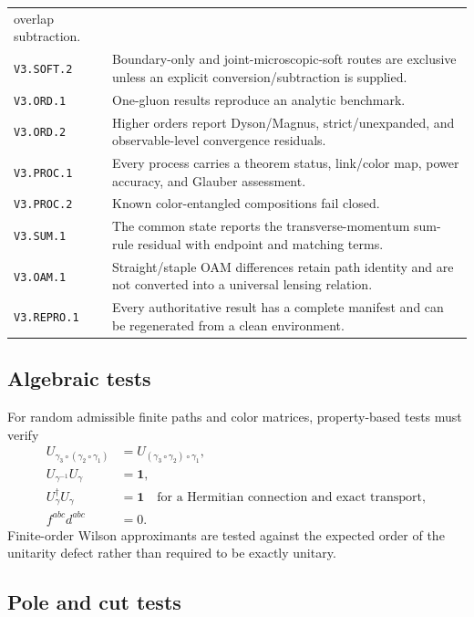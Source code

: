 \documentclass[11pt]{article}
\newcommand{\bbone}{\bm 1}
\begin{document}
\begin{longtable}{L{0.14\textwidth}L{0.77\textwidth}}
overlap subtraction.\\
\texttt{V3.SOFT.2} & Boundary-only and joint-microscopic-soft routes are
exclusive unless an explicit conversion/subtraction is supplied.\\
\texttt{V3.ORD.1} & One-gluon results reproduce an analytic benchmark.\\
\texttt{V3.ORD.2} & Higher orders report Dyson/Magnus, strict/unexpanded, and
observable-level convergence residuals.\\
\texttt{V3.PROC.1} & Every process carries a theorem status, link/color map,
power accuracy, and Glauber assessment.\\
\texttt{V3.PROC.2} & Known color-entangled compositions fail closed.\\
\texttt{V3.SUM.1} & The common state reports the transverse-momentum sum-rule
residual with endpoint and matching terms.\\
\texttt{V3.OAM.1} & Straight/staple OAM differences retain path identity and
are not converted into a universal lensing relation.\\
\texttt{V3.REPRO.1} & Every authoritative result has a complete manifest and
can be regenerated from a clean environment.\\
\bottomrule
\end{longtable}

\subsection{Algebraic tests}

For random admissible finite paths and color matrices, property-based tests
must verify
\begin{align}
 U_{\gamma_3\circ(\gamma_2\circ\gamma_1)}
 &=U_{(\gamma_3\circ\gamma_2)\circ\gamma_1},
\label{eq:path-associativity-test}\\
 U_{\gamma^{-1}}U_\gamma&=\bbone,
\label{eq:path-inverse-test}\\
 U_\gamma^\dagger U_\gamma&=\bbone
\quad\text{for a Hermitian connection and exact transport},
\label{eq:path-unitarity-test}\\
 f^{abc}d^{abc}&=0.
\label{eq:fd-test}
\end{align}
Finite-order Wilson approximants are tested against the expected order of the
unitarity defect rather than required to be exactly unitary.

\subsection{Pole and cut tests}
\end{document}
